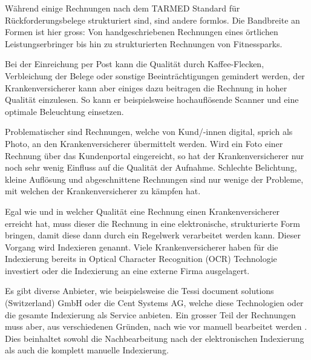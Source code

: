 \documentclass{hwz}
\begin{document}
Während einige Rechnungen nach dem TARMED Standard für Rückforderungsbelege strukturiert sind, sind andere formlos. Die Bandbreite an Formen ist hier gross: Von handgeschriebenen Rechnungen eines örtlichen Leistungserbringer bis hin zu strukturierten Rechnungen von Fitnessparks.

Bei der Einreichung per Post kann die Qualität durch Kaffee-Flecken, Verbleichung der Belege oder sonstige Beeinträchtigungen gemindert werden, der Krankenversicherer kann aber einiges dazu beitragen die Rechnung in hoher Qualität einzulesen. So kann er beispielsweise hochauflösende Scanner und eine optimale Beleuchtung einsetzen.

Problematischer sind Rechnungen, welche von Kund/-innen digital, sprich als Photo, an den Krankenversicherer übermittelt werden. Wird ein Foto einer Rechnung über das Kundenportal eingereicht, so hat der Krankenversicherer nur noch sehr wenig Einfluss auf die Qualität der Aufnahme. Schlechte Belichtung, kleine Auflösung und abgeschnittene Rechnungen sind nur wenige der Probleme, mit welchen der Krankenversicherer zu kämpfen hat.

Egal wie und in welcher Qualität eine Rechnung einen Krankenversicherer erreicht hat, muss dieser die Rechnung in eine elektronische, strukturierte Form bringen, damit diese dann durch ein Regelwerk verarbeitet werden kann. Dieser Vorgang wird Indexieren genannt. Viele Krankenversicherer haben für die Indexierung bereits in Optical Character Recognition (OCR) Technologie investiert oder die Indexierung an eine externe Firma ausgelagert. 


Es gibt diverse Anbieter, wie beispielsweise die Tessi document solutions (Switzerland) GmbH oder die Cent Systems AG, welche diese Technologien oder die gesamte Indexierung als Service anbieten. Ein grosser Teil der Rechnungen muss aber, aus verschiedenen Gründen, nach wie vor manuell bearbeitet werden . Dies beinhaltet sowohl die Nachbearbeitung nach der elektronischen Indexierung als auch die komplett manuelle Indexierung. %
\end{document}
